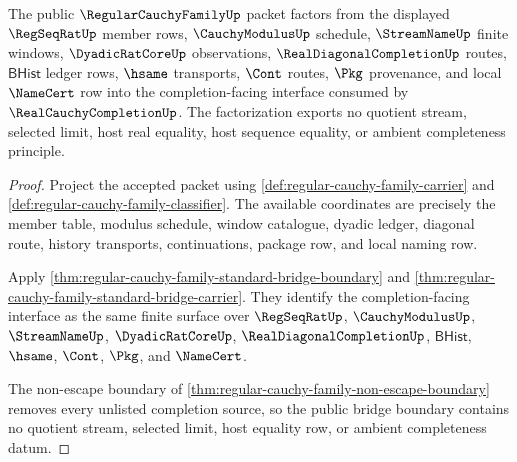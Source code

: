 \begin{theorem}
\label{thm:regular-cauchy-family-public-bridge-boundary}
The public $\RegularCauchyFamilyUp$ packet factors from the displayed $\RegSeqRatUp$ member rows, $\CauchyModulusUp$ schedule, $\StreamNameUp$ finite windows, $\DyadicRatCoreUp$ observations, $\RealDiagonalCompletionUp$ routes, $\mathsf{BHist}$ ledger rows, $\hsame$ transports, $\Cont$ routes, $\Pkg$ provenance, and local $\NameCert$ row into the completion-facing interface consumed by $\RealCauchyCompletionUp$. The factorization exports no quotient stream, selected limit, host real equality, host sequence equality, or ambient completeness principle.
\end{theorem}
\begin{proof}
Project the accepted packet using \autoref{def:regular-cauchy-family-carrier} and \autoref{def:regular-cauchy-family-classifier}. The available coordinates are precisely the member table, modulus schedule, window catalogue, dyadic ledger, diagonal route, history transports, continuations, package row, and local naming row.

Apply \autoref{thm:regular-cauchy-family-standard-bridge-boundary} and \autoref{thm:regular-cauchy-family-standard-bridge-carrier}. They identify the completion-facing interface as the same finite surface over $\RegSeqRatUp$, $\CauchyModulusUp$, $\StreamNameUp$, $\DyadicRatCoreUp$, $\RealDiagonalCompletionUp$, $\mathsf{BHist}$, $\hsame$, $\Cont$, $\Pkg$, and $\NameCert$.

The non-escape boundary of \autoref{thm:regular-cauchy-family-non-escape-boundary} removes every unlisted completion source, so the public bridge boundary contains no quotient stream, selected limit, host equality row, or ambient completeness datum.
\end{proof}

